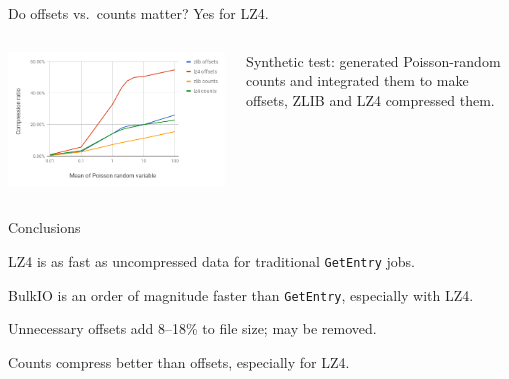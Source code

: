 \documentclass[aspectratio=169]{beamer}
\begin{document}
\begin{frame}{Do offsets vs.\ counts matter? Yes for LZ4.}
\vspace{0.25 cm}
\begin{columns}
\includegraphics[width=\linewidth]{offsets-vs-counts.png}

Synthetic test: generated Poisson-random counts and integrated them to make offsets, ZLIB and LZ4 compressed them.
\end{columns}
\end{frame}

\begin{frame}{Conclusions}
\vspace{0.5 cm}
\begin{center}
\begin{minipage}{0.88\linewidth}
LZ4 is as fast as uncompressed data for traditional {\tt GetEntry} jobs.

\vspace{0.5 cm}
BulkIO is an order of magnitude faster than {\tt GetEntry}, especially with LZ4.

\vspace{0.5 cm}
Unnecessary offsets add 8--18\% to file size; may be removed.

\vspace{0.5 cm}
Counts compress better than offsets, especially for LZ4.
\end{minipage}
\end{center}
\end{frame}
\end{document}
